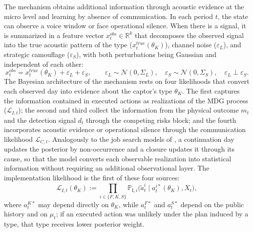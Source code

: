 \documentclass[review,authoryear,12pt]{elsarticle}
\theoremstyle{plain}
\theoremstyle{definition}
\newcommand{\1}{\mathbf{1}}
\newcommand{\ProbI}[1]{\mathbb{P}_{\mathrm{I},#1}}
\begin{document}
The mechanism obtains additional information through acoustic evidence at the micro level and learning by absence of communication. In each period $t$, the state can observe a voice window or face operational silence. When there is a signal, it is summarized in a feature vector $x_t^{obs}\in\mathbb{R}^k$ that decomposes the observed signal into the true acoustic pattern of the type ($x_t^{true}(\theta_K)$), channel noise ($\varepsilon_L$), and strategic camouflage ($\varepsilon_S$), with both perturbations being Gaussian and independent of each other:
\begin{equation}
x_t^{obs}=x_t^{true}(\theta_K)+\varepsilon_L+\varepsilon_S,\qquad\varepsilon_L\sim\mathcal{N}(0,\Sigma_L),\quad\varepsilon_S\sim\mathcal{N}(0,\Sigma_S),\quad\varepsilon_L\perp\varepsilon_S.
\label{eq:voz-descomp}
\end{equation}
The Bayesian architecture of the mechanism rests on four likelihoods that convert each observed day into evidence about the captor's type $\theta_K$. The first captures the information contained in executed actions as realizations of the MDG process ($\mathcal{L}_{I,t}$); the second and third collect the information from the physical outcome $m_t$ and the detection signal $d_t$ through the competing risks block; and the fourth incorporates acoustic evidence or operational silence through the communication likelihood $\mathcal{L}_{C,t}$. Analogously to the job search models of \citet{McCall1970}, a continuation day updates the posterior by non-occurrence and a closure updates it through its cause, so that the model converts each observable realization into statistical information without requiring an additional observational layer. The implementation likelihood is the first of these four sources:
\begin{equation}
\mathcal{L}_{I,t}(\theta_K):=\prod_{i\in\{F,K,S\}}\ProbI{i}\!\bigl(\tilde{a}_t^i\mid a_t^{i\ast}(\theta_K),X_t\bigr),
\label{eq:LI-atilde}
\end{equation}
where $a_t^{K\ast}$ may depend directly on $\theta_K$, while $a_t^{F\ast}$ and $a_t^{S\ast}$ depend on the public history and on $\mu_t$; if an executed action was unlikely under the plan induced by a type, that type receives lower posterior weight.
\end{document}
